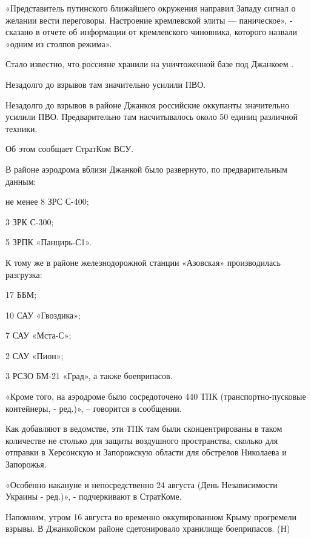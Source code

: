 «Представитель путинского ближайшего окружения направил Западу сигнал о желании вести переговоры. Настроение кремлевской элиты — паническое», - сказано в отчете об информации от кремлевского чиновника, которого назвали «одним из столпов режима».


Стало известно, что россияне хранили на уничтоженной базе под Джанкоем .

Незадолго до взрывов там значительно усилили ПВО.

Незадолго до взрывов в районе Джанкоя российские оккупанты значительно усилили ПВО. Предварительно там насчитывалось около 50 единиц различной техники.

Об этом сообщает СтратКом ВСУ.

В районе аэродрома вблизи Джанкой было развернуто, по предварительным данным:

не менее 8 ЗРС С-400;

3 ЗРК С-300;

5 ЗРПК «Панцирь-С1».

К тому же в районе железнодорожной станции «Азовская» производилась разгрузка:

17 ББМ;

10 САУ «Гвоздика»;

7 САУ «Мста-С»;

2 САУ «Пион»;

3 РСЗО БМ-21 «Град», а также боеприпасов.

«Кроме того, на аэродроме было сосредоточено 440 ТПК (транспортно-пусковые контейнеры, - ред.)», – говорится в сообщении.

Как добавляют в ведомстве, эти ТПК там были сконцентрированы в таком количестве не столько для защиты воздушного пространства, сколько для отправки в Херсонскую и Запорожскую области для обстрелов Николаева и Запорожья.

«Особенно накануне и непосредственно 24 августа (День Независимости Украины - ред.)», - подчеркивают в СтратКоме.

Напомним, утром 16 августа во временно оккупированном Крыму прогремели взрывы. В Джанкойском районе сдетонировало хранилище боеприпасов. 
(H)
